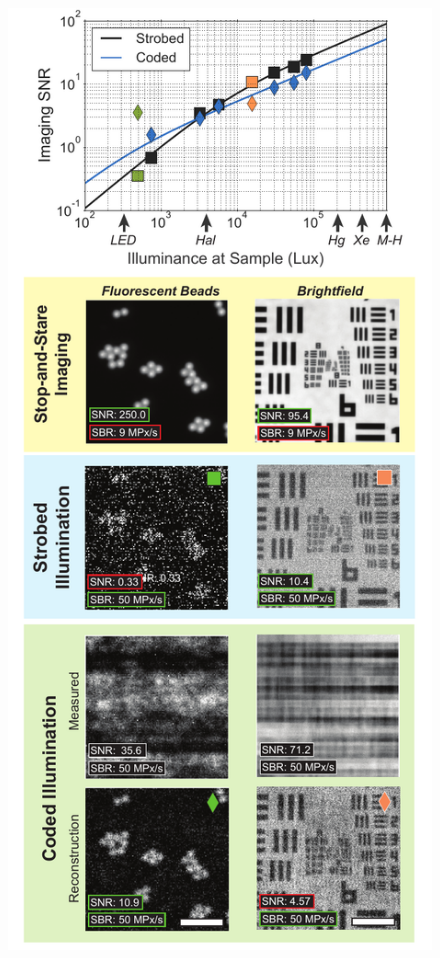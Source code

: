 \begin{figure}
  \begin{minipage}[c]{0.5\textwidth}
    \includegraphics[width=\textwidth]{figures/fig_highthroughput_snr_comparison.pdf}

\end{minipage}
\end{figure}
